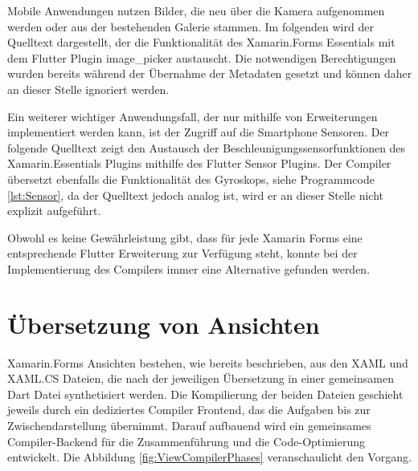 Mobile Anwendungen nutzen Bilder, die neu über die Kamera aufgenommen werden oder aus der bestehenden Galerie stammen.  Im folgenden wird der Quelltext dargestellt, der die Funktionalität des Xamarin.Forms Essentials mit dem Flutter Plugin \glq image\_picker\grq{} austauscht.  Die notwendigen Berechtigungen wurden bereits während der Übernahme der Metadaten gesetzt und können daher an dieser Stelle ignoriert werden.



Ein weiterer wichtiger Anwendungsfall,  der nur mithilfe von Erweiterungen implementiert werden kann,  ist der Zugriff auf die Smartphone Sensoren.  Der folgende Quelltext zeigt den Austausch der Beschleunigungssensorfunktionen des Xamarin.Essentials Plugins mithilfe des Flutter Sensor Plugins.  Der Compiler übersetzt ebenfalls die Funktionalität des Gyroskops, siehe Programmcode \ref{lst:Sensor},  da der Quelltext jedoch analog ist, wird er an dieser Stelle nicht explizit aufgeführt. 



 Obwohl es keine Gewährleistung gibt, dass für jede Xamarin Forms eine entsprechende Flutter 
Erweiterung zur Verfügung steht, konnte bei der Implementierung des Compilers immer eine  Alternative gefunden werden.


\section{Übersetzung von Ansichten}
Xamarin.Forms Ansichten bestehen, wie bereits beschrieben,  aus den XAML und XAML.CS Dateien, die nach der jeweiligen Übersetzung  in einer gemeinsamen Dart Datei synthetisiert werden.  
Die Kompilierung der beiden Dateien geschieht jeweils durch ein dediziertes Compiler Frontend, das die Aufgaben bis zur Zwischendarstellung übernimmt.  Darauf aufbauend wird ein gemeinsames Compiler-Backend für die Zusammenführung und die Code-Optimierung entwickelt.  Die Abbildung  \ref{fig:ViewCompilerPhases} veranschaulicht den Vorgang. 

